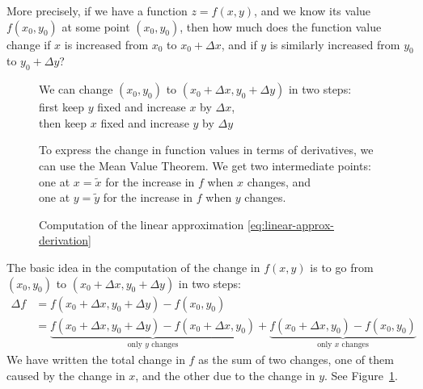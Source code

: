 More precisely, if we have a function $z=f(x,y)$, and we know its value
$f(x_0,y_0)$ at some point $(x_0,y_0)$, then how much does the function value
change if $x$ is increased from $x_0$ to $x_0+\Delta x$, and if $y$ is similarly
increased from $y_0$ to $y_0+\Delta y$?
\begin{figure}[h]

  \parbox{0.4\textwidth}{}
  \hfill
  \parbox{0.59\textwidth}{\dfnt%
    We can change $(x_0,y_0)$ to $(x_0+\Delta x, y_0+\Delta y)$ in
    two steps: \\
    \null\quad first keep $y$ fixed and increase $x$ by $\Delta x$,\\
    \null\quad then keep $x$ fixed and increase $y$ by $\Delta y$}
 
  \parbox{0.4\textwidth}{}
  \hfill
  \parbox{0.59\textwidth}{\dfnt%
    To express the change in function values in terms of derivatives, we can use
    the Mean Value Theorem.   We get two intermediate points:\\
    \null\quad one at $x=\tilde x$ for the increase in $f$ when $x$ changes, and\\
    \null\quad one at $y=\tilde y$ for the increase in $f$ when $y$ changes.}
 
  \caption{Computation of the linear approximation
    \eqref{eq:linear-approx-derivation} }
  \label{fig:computation-of-linear-approximation}
\end{figure}

The basic idea in the computation of the change in $f(x, y)$ is to go from
$(x_0,y_0)$ to $(x_0+\Delta x, y_0+\Delta y)$ in two steps:
\begin{align}
  \label{eq:linear-approx-derivation}
  \Delta f & = f(x_0+\Delta x, y_0+\Delta y) - f(x_0, y_0)\\
  &= \underbrace{f(x_0+\Delta x, y_0+\Delta y) - f(x_0+\Delta x, y_0)}
  _{\text{only $y$ changes}} + \underbrace{f(x_0+\Delta x, y_0) - f(x_0,
    y_0)}_{\text{only $x$ changes}} \nonumber
\end{align}
We have written the total change in $f$ as the sum of two changes, one of them
caused by the change in $x$, and the other due to the change in $y$.  See
Figure~\ref{fig:computation-of-linear-approximation}.

